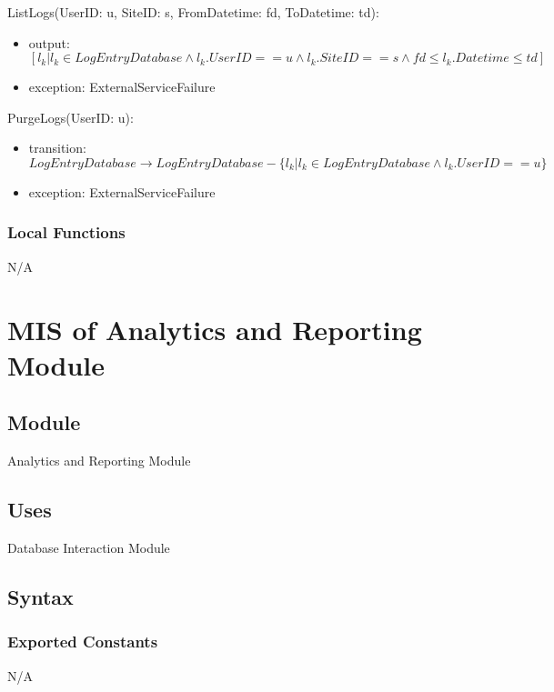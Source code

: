 \documentclass[12pt, titlepage]{article}
\begin{document}
\noindent ListLogs(UserID: u, SiteID: s, FromDatetime: fd, ToDatetime: td):
\begin{itemize}
  \item output: $[l_k | l_k \in LogEntryDatabase \land l_k.UserID ==
    u \land l_k.SiteID == s \land fd \le l_k.Datetime \le td]$
  \item exception: ExternalServiceFailure
\end{itemize}

\noindent PurgeLogs(UserID: u):
\begin{itemize}
  \item transition: $LogEntryDatabase \rightarrow LogEntryDatabase -
    \{l_k | l_k \in LogEntryDatabase \land l_k.UserID == u \}$
  \item exception: ExternalServiceFailure
\end{itemize}

\subsubsection{Local Functions}

N/A

\section{MIS of Analytics and Reporting Module} \label{Module}

\subsection{Module}
Analytics and Reporting Module

\subsection{Uses}
Database Interaction Module

\subsection{Syntax}

\subsubsection{Exported Constants}
N/A
\end{document}
